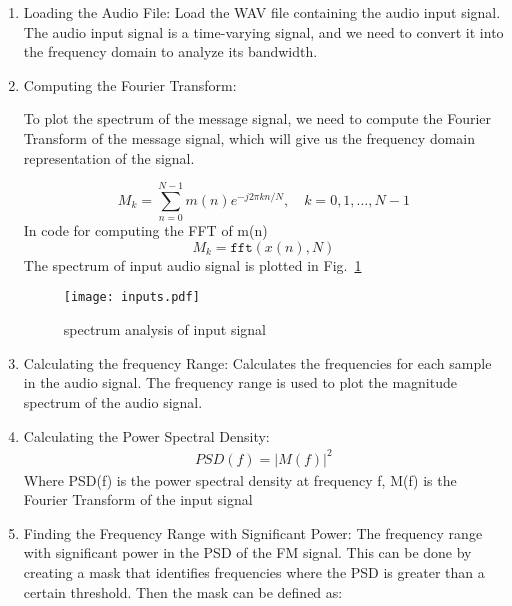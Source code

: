 \documentclass[journal,5pt,twocolumn]{IEEEtran}
\newcommand\figref{Fig.~\ref}
\begin{document}
\begin{enumerate}
\item Loading the Audio File:  Load the WAV file containing the audio input signal.
The audio input signal is a time-varying signal, and we need to convert it into the frequency domain to analyze its bandwidth.



\item Computing the Fourier Transform:

To plot the spectrum of the message signal, we need to compute the Fourier Transform of the message signal, which will give us the frequency domain representation of the signal.

\begin{equation}
M_k = \sum_{n=0}^{N-1} m(n) e^{-j2\pi kn/N}, \quad k=0,1,\dots,N-1
\end{equation}
In code for computing the FFT of m(n)
\begin{equation}
M_k = \texttt{fft}(x(n), N)
\end{equation}
The spectrum of input audio signal is plotted in \figref{fig:input_spectrum}
\begin{figure}
\centering 
\texttt{[image: inputs.pdf]} 
\caption{spectrum analysis of input signal}
\label{fig:input_spectrum}
\end{figure}

\iffalse
\begin{align*}
M(f) = FFT(m(t))
\end{align*}
Where M(f) is the frequency representation of the signal, m(t) is the input signal
\fi
\item Calculating the frequency Range: Calculates the frequencies for each sample in the audio signal. The frequency range is used to plot the magnitude spectrum of the audio signal.

\item Calculating the Power Spectral Density:
\begin{align*}
PSD(f)=\lvert M(f) \rvert^2 
\end{align*}
Where PSD(f) is the power spectral density at frequency f, M(f) is the Fourier Transform of the input signal

\item Finding the Frequency Range with Significant Power:
The frequency range with significant power in the PSD of the FM signal. This can be done by creating a mask that identifies frequencies where the PSD is greater than a certain threshold. Then the mask can be defined as:


\end{enumerate}
\end{document}
